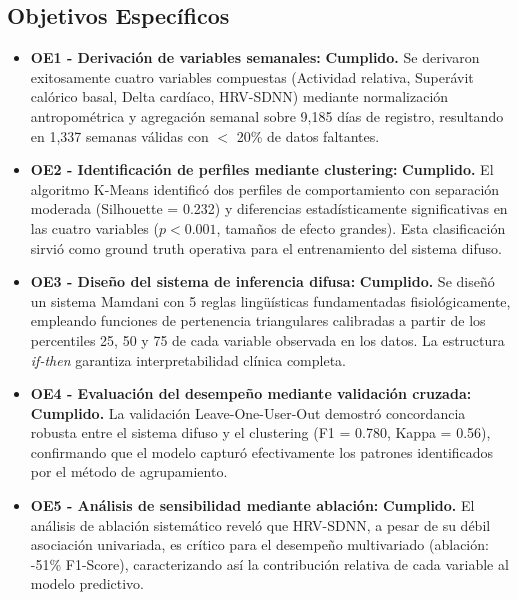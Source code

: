 \subsection{Objetivos Específicos}
\label{subsec:cumplimiento_oe}

\begin{itemize}
    \item \textbf{OE1 - Derivación de variables semanales:} \textbf{Cumplido.} Se derivaron exitosamente cuatro variables compuestas (Actividad relativa, Superávit calórico basal, Delta cardíaco, HRV-SDNN) mediante normalización antropométrica y agregación semanal sobre 9,185 días de registro, resultando en 1,337 semanas válidas con $<$ 20\% de datos faltantes.
    
    \item \textbf{OE2 - Identificación de perfiles mediante clustering:} \textbf{Cumplido.} El algoritmo K-Means identificó dos perfiles de comportamiento con separación moderada (Silhouette = 0.232) y diferencias estadísticamente significativas en las cuatro variables ($p < 0.001$, tamaños de efecto grandes). Esta clasificación sirvió como ground truth operativa para el entrenamiento del sistema difuso.
    
    \item \textbf{OE3 - Diseño del sistema de inferencia difusa:} \textbf{Cumplido.} Se diseñó un sistema Mamdani con 5 reglas lingüísticas fundamentadas fisiológicamente, empleando funciones de pertenencia triangulares calibradas a partir de los percentiles 25, 50 y 75 de cada variable observada en los datos. La estructura \textit{if-then} garantiza interpretabilidad clínica completa.
    
    \item \textbf{OE4 - Evaluación del desempeño mediante validación cruzada:} \textbf{Cumplido.} La validación Leave-One-User-Out demostró concordancia robusta entre el sistema difuso y el clustering (F1 = 0.780, Kappa = 0.56), confirmando que el modelo capturó efectivamente los patrones identificados por el método de agrupamiento.
    
    \item \textbf{OE5 - Análisis de sensibilidad mediante ablación:} \textbf{Cumplido.} El análisis de ablación sistemático reveló que HRV-SDNN, a pesar de su débil asociación univariada, es crítico para el desempeño multivariado (ablación: -51\% F1-Score), caracterizando así la contribución relativa de cada variable al modelo predictivo.
\end{itemize}


